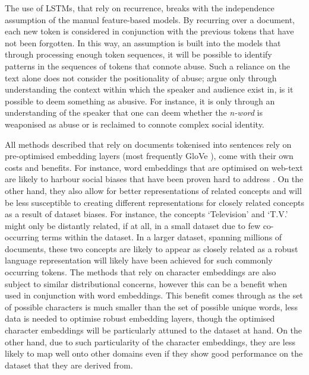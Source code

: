 The use of LSTMs, that rely on recurrence, breaks with the independence assumption of the manual feature-based models.
By recurring over a document, each new token is considered in conjunction with the previous tokens that have not been forgotten.
In this way, an assumption is built into the models that through processing enough token sequences, it will be possible to identify patterns in the sequences of tokens that connote abuse.
Such a reliance on the text alone does not consider the positionality of abuse; \citet{Waseem:2018} argue only through understanding the context within which the speaker and audience exist in, is it possible to deem something as abusive.
For instance, it is only through an understanding of the speaker that one can deem whether the \textit{n-word} is weaponised as abuse or is reclaimed to connote complex social identity.

All methods described that rely on documents tokenised into sentences rely on pre-optimised embedding layers (most frequently GloVe \citet{Pennington:2014}), come with their own costs and benefits.
For instance, word embeddings that are optimised on web-text are likely to harbour social biases \citep{Bolukbasi:2016} that have been proven hard to address \citep{Gonen:2019}.
On the other hand, they also allow for better representations of related concepts and will be less susceptible to creating different representations for closely related concepts as a result of dataset biases.
For instance, the concepts `Television' and `T.V.' might only be distantly related, if at all, in a small dataset due to few co-occurring terms within the dataset.
In a larger dataset, spanning millions of documents, these two concepts are likely to appear as closely related as a robust language representation will likely have been achieved for such commonly occurring tokens.
The methods that rely on character embeddings are also subject to similar distributional concerns, however this can be a benefit when used in conjunction with word embeddings.
This benefit comes through as the set of possible characters is much smaller than the set of possible unique words, less data is needed to optimise robust embedding layers, though the optimised character embeddings will be particularly attuned to the dataset at hand.
On the other hand, due to such particularity of the character embeddings, they are less likely to map well onto other domains even if they show good performance on the dataset that they are derived from.

